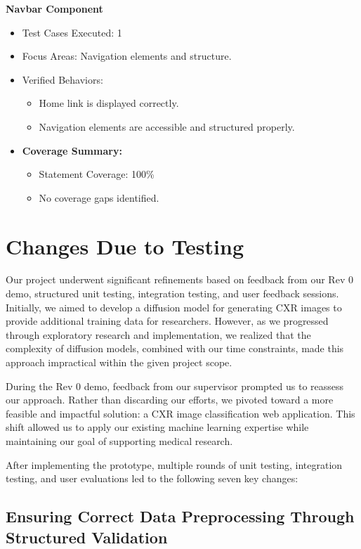 \documentclass[12pt, titlepage]{article}
\begin{document}
\textbf{Navbar Component}
\begin{itemize}
    \item Test Cases Executed: 1
    \item Focus Areas: Navigation elements and structure.
    \item Verified Behaviors:
    \begin{itemize}
        \item Home link is displayed correctly.
        \item Navigation elements are accessible and structured properly.
    \end{itemize}
    \item \textbf{Coverage Summary:}
    \begin{itemize}
        \item Statement Coverage: 100\%
        \item No coverage gaps identified.
    \end{itemize}
\end{itemize}



\section{Changes Due to Testing}

Our project underwent significant refinements based on feedback from our Rev 0 demo, structured unit testing, integration testing, and user feedback sessions. Initially, we aimed to develop a diffusion model for generating CXR images to provide additional training data for researchers. However, as we progressed through exploratory research and implementation, we realized that the complexity of diffusion models, combined with our time constraints, made this approach impractical within the given project scope.

During the Rev 0 demo, feedback from our supervisor prompted us to reassess our approach. Rather than discarding our efforts, we pivoted toward a more feasible and impactful solution: a CXR image classification web application. This shift allowed us to apply our existing machine learning expertise while maintaining our goal of supporting medical research.

After implementing the prototype, multiple rounds of unit testing, integration testing, and user evaluations led to the following seven key changes:

\subsection{Ensuring Correct Data Preprocessing Through Structured Validation}
\end{document}
